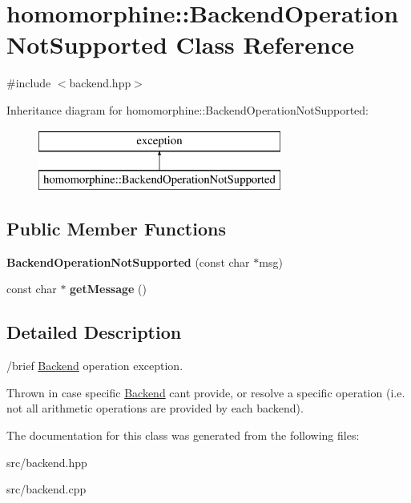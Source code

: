 \hypertarget{classhomomorphine_1_1_backend_operation_not_supported}{}\section{homomorphine\+:\+:Backend\+Operation\+Not\+Supported Class Reference}
\label{classhomomorphine_1_1_backend_operation_not_supported}


{\ttfamily \#include $<$backend.\+hpp$>$}

Inheritance diagram for homomorphine\+:\+:Backend\+Operation\+Not\+Supported\+:\begin{figure}[H]
\begin{center}
\leavevmode
\includegraphics[height=2.000000cm]{classhomomorphine_1_1_backend_operation_not_supported}
\end{center}
\end{figure}
\subsection*{Public Member Functions}
\begin{DoxyCompactItemize}
\item 
\mbox{\label{classhomomorphine_1_1_backend_operation_not_supported_a8db72ebb31be4189807aa36fec1ee927}} 
{\bfseries Backend\+Operation\+Not\+Supported} (const char $\ast$msg)
\item 
\mbox{\label{classhomomorphine_1_1_backend_operation_not_supported_a909fc0802c577f246d5400baba44da45}} 
const char $\ast$ {\bfseries get\+Message} ()
\end{DoxyCompactItemize}


\subsection{Detailed Description}
/brief \hyperlink{classhomomorphine_1_1_backend}{Backend} operation exception.

Thrown in case specific \hyperlink{classhomomorphine_1_1_backend}{Backend} can\textquotesingle{}t provide, or resolve a specific operation (i.\+e. not all arithmetic operations are provided by each backend). 

The documentation for this class was generated from the following files\+:\begin{DoxyCompactItemize}
\item 
src/backend.\+hpp\item 
src/backend.\+cpp\end{DoxyCompactItemize}
